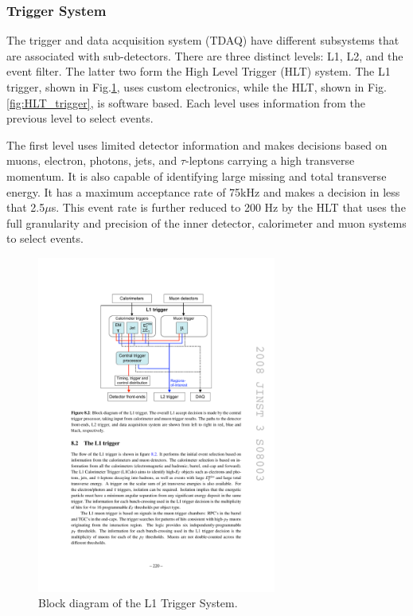 \subsubsection{Trigger System}
The trigger and data acquisition system (TDAQ) have different subsystems that are associated with sub-detectors. There are three distinct levels: L1, L2, and the event filter. The latter two form the High Level Trigger (HLT) system. The L1 trigger, shown in Fig.\ref{fig:L1_trigger}, uses custom electronics, while the HLT, shown in Fig.\ref{fig:HLT_trigger}, is software based. Each level uses information from the previous level to select events. 

The first level uses limited detector information and makes decisions based on muons, electron, photons, jets, and $\tau$-leptons carrying a high transverse momentum. It is also capable of identifying large missing and total transverse energy.  It has a maximum acceptance rate of 75kHz and makes a decision in less that 2.5$\mu$s. This event rate is further reduced to 200 Hz by the HLT that uses the full granularity and precision of the inner detector, calorimeter and muon systems to select events. 


\begin{figure}[ht]
	\centering
        \includegraphics[width=0.7\textwidth]{figures/setup/L1_Trigger}
          \caption{Block diagram of the L1 Trigger System.}
          \label{fig:L1_trigger}
\end{figure}

